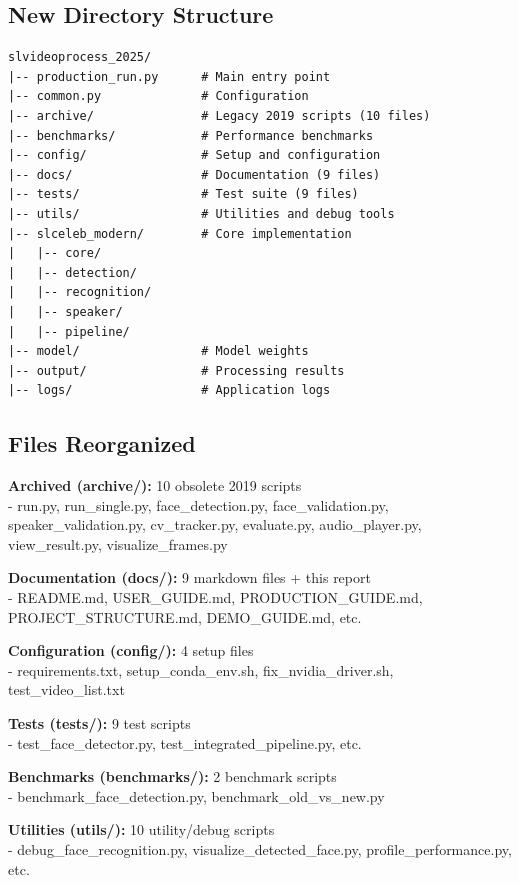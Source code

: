\documentclass[12pt,a4paper]{article}
\begin{document}
\subsection{New Directory Structure}

\begin{lstlisting}[basicstyle=\ttfamily\footnotesize]
slvideoprocess_2025/
|-- production_run.py      # Main entry point
|-- common.py              # Configuration
|-- archive/               # Legacy 2019 scripts (10 files)
|-- benchmarks/            # Performance benchmarks
|-- config/                # Setup and configuration
|-- docs/                  # Documentation (9 files)
|-- tests/                 # Test suite (9 files)
|-- utils/                 # Utilities and debug tools
|-- slceleb_modern/        # Core implementation
|   |-- core/
|   |-- detection/
|   |-- recognition/
|   |-- speaker/
|   |-- pipeline/
|-- model/                 # Model weights
|-- output/                # Processing results
|-- logs/                  # Application logs
\end{lstlisting}

\subsection{Files Reorganized}

\textbf{Archived (archive/):} 10 obsolete 2019 scripts\\
- run.py, run\_single.py, face\_detection.py, face\_validation.py, speaker\_validation.py, cv\_tracker.py, evaluate.py, audio\_player.py, view\_result.py, visualize\_frames.py

\textbf{Documentation (docs/):} 9 markdown files + this report\\
- README.md, USER\_GUIDE.md, PRODUCTION\_GUIDE.md, PROJECT\_STRUCTURE.md, DEMO\_GUIDE.md, etc.

\textbf{Configuration (config/):} 4 setup files\\
- requirements.txt, setup\_conda\_env.sh, fix\_nvidia\_driver.sh, test\_video\_list.txt

\textbf{Tests (tests/):} 9 test scripts\\
- test\_face\_detector.py, test\_integrated\_pipeline.py, etc.

\textbf{Benchmarks (benchmarks/):} 2 benchmark scripts\\
- benchmark\_face\_detection.py, benchmark\_old\_vs\_new.py

\textbf{Utilities (utils/):} 10 utility/debug scripts\\
- debug\_face\_recognition.py, visualize\_detected\_face.py, profile\_performance.py, etc.
\end{document}
